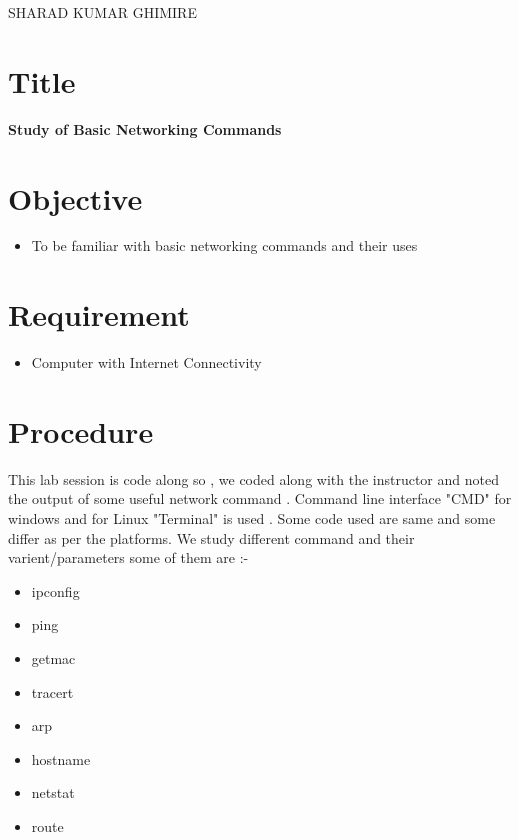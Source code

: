 \documentclass[a4paper,12pt]{article}
\begin{document}
{SHARAD KUMAR GHIMIRE}

\renewcommand{\contentsname}{Table of Contents}
\tableofcontents

\pagebreak
\lstlistoflistings
\pagebreak
{}

\section{Title} \textbf{Study of Basic Networking Commands}
\section{Objective}
\begin{itemize}
    \item To be familiar with basic networking commands and their uses
\end{itemize}
\section{Requirement}
\begin{itemize}
    \item Computer with Internet Connectivity
\end{itemize}

\section {Procedure}
This lab session is code along so , we coded along with the instructor and
noted the output of some useful network command . Command line interface "CMD" for windows and for Linux "Terminal" is used .
Some code used are same and some differ as per the platforms. We study different command and their varient/parameters
some of them are :-


\begin{itemize}
    \item ipconfig
    \item ping
    \item getmac
    \item tracert
    \item arp
    \item hostname
    \item netstat
    \item route
\end{itemize}
\end{document}
